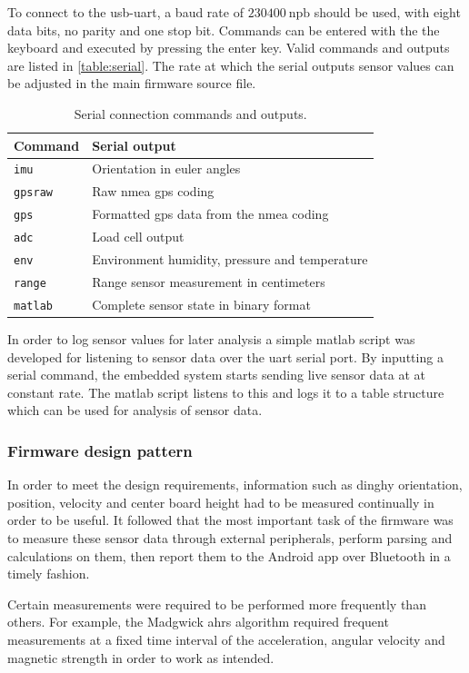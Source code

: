 To connect to the \gls{usb}-\gls{uart}, a baud rate of $230400~\textrm{npb}$ should be used, with eight data bits, no parity and one stop bit. Commands can be entered with the the keyboard and executed by pressing the enter key. Valid commands and outputs are listed in \autoref{table:serial}. The rate at which the serial outputs sensor values can be adjusted in the main firmware source file.
\begin{table}[H]
\centering
\begin{tabular}{ l | l }
 	Command 		& Serial output \\
  	\hline
  	\texttt{imu} 		& Orientation in euler angles \\
  	\texttt{gpsraw} 	& Raw \gls{nmea} \gls{gps} coding\\
  	\texttt{gps} 		& Formatted \gls{gps} data from the \gls{nmea} coding\\
  	\texttt{adc} 		& Load cell output\\
  	\texttt{env} 		& Environment humidity, pressure and temperature \\
  	\texttt{range} 	& Range sensor measurement in centimeters \\
  	\texttt{matlab} 	& Complete sensor state in binary format \\
\end{tabular}
\caption{Serial connection commands and outputs.}
\label{table:serial}
\end{table}

In order to log sensor values for later analysis a simple \gls{matlab} script was developed for listening to sensor data over the \gls{uart} serial port. By inputting a serial command, the embedded system starts sending live sensor data at at constant rate. The \gls{matlab} script listens to this and logs it to a table structure which can be used for analysis of sensor data.

\subsubsection{Firmware design pattern}
In order to meet the design requirements, information such as dinghy orientation, position, velocity and center board height had to be measured continually in order to be useful. It followed that the most important task of the firmware was to measure these sensor data through external peripherals, perform parsing and calculations on them, then report them to the Android app over Bluetooth in a timely fashion. 

Certain measurements were required to be performed more frequently than others. For example, the Madgwick \gls{ahrs} algorithm required frequent measurements at a fixed time interval of the acceleration, angular velocity and magnetic strength in order to work as intended.

